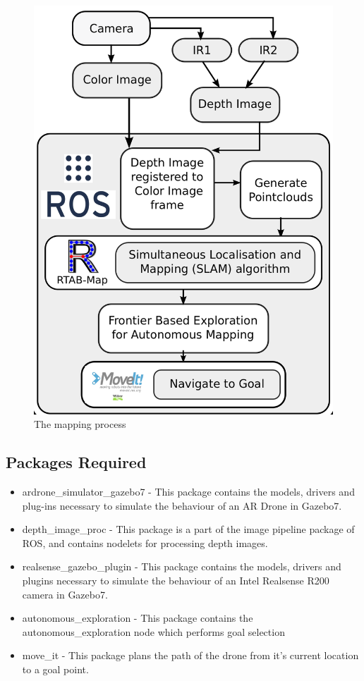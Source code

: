 \documentclass[a4paper,12pt,oneside]{book}
\begin{document}
\begin{figure}[h]
	\centering
	\includegraphics[scale=0.27]{process}
	\caption{The mapping process}
\end{figure}

\subsection*{Packages Required}
\begin{itemize}
	\item ardrone\_simulator\_gazebo7 - This package contains the models, drivers and plug-ins necessary to simulate the behaviour of an AR Drone in Gazebo7. 

	\item depth\_image\_proc - This package is a part of the image pipeline package of ROS, and contains nodelets for processing depth images.
		
	\item realsense\_gazebo\_plugin	- This package contains the models, drivers and plugins necessary to simulate the behaviour of an Intel Realsense R200 camera in Gazebo7.
	
	\item autonomous\_exploration - This package contains the autonomous\_exploration node which performs goal selection
		
	\item move\_it - This package plans the path of the drone from it's current location to a goal point.		
		
\end{itemize}
\end{document}

